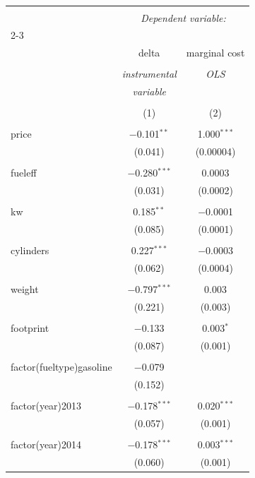
\begin{table}[!htbp] \centering 
  \caption{} 
  \label{} 
\begin{tabular}{@{\extracolsep{5pt}}lcc} 
\\[-1.8ex]\hline 
\hline \\[-1.8ex] 
 & \multicolumn{2}{c}{\textit{Dependent variable:}} \\ 
\cline{2-3} 
\\[-1.8ex] & delta & marginal cost \\ 
\\[-1.8ex] & \textit{instrumental} & \textit{OLS} \\ 
 & \textit{variable} & \textit{} \\ 
\\[-1.8ex] & (1) & (2)\\ 
\hline \\[-1.8ex] 
 price & $-$0.101$^{**}$ & 1.000$^{***}$ \\ 
  & (0.041) & (0.00004) \\ 
  & & \\ 
 fueleff & $-$0.280$^{***}$ & 0.0003 \\ 
  & (0.031) & (0.0002) \\ 
  & & \\ 
 kw & 0.185$^{**}$ & $-$0.0001 \\ 
  & (0.085) & (0.0001) \\ 
  & & \\ 
 cylinders & 0.227$^{***}$ & $-$0.0003 \\ 
  & (0.062) & (0.0004) \\ 
  & & \\ 
 weight & $-$0.797$^{***}$ & 0.003 \\ 
  & (0.221) & (0.003) \\ 
  & & \\ 
 footprint & $-$0.133 & 0.003$^{*}$ \\ 
  & (0.087) & (0.001) \\ 
  & & \\ 
 factor(fueltype)gasoline & $-$0.079 &  \\ 
  & (0.152) &  \\ 
  & & \\ 
 factor(year)2013 & $-$0.178$^{***}$ & 0.020$^{***}$ \\ 
  & (0.057) & (0.001) \\ 
  & & \\ 
 factor(year)2014 & $-$0.178$^{***}$ & 0.003$^{***}$ \\ 
  & (0.060) & (0.001) \\ 

\end{tabular}
\end{table}
